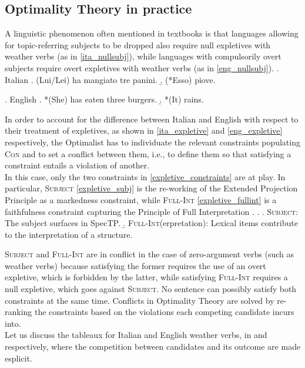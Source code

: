 \subsection{Optimality Theory in practice} A linguistic phenomenon often mentioned in textbooks is that languages allowing for topic-referring subjects to be dropped also require null expletives with weather verbs (as in \ref{ita_nullsubj}), while languages with compulsorily overt subjects require overt expletives with weather verbs (as in \ref{eng_nullsubj}).
\ex. \label{ita_nullsubj} Italian
\a. (Lui/Lei) ha mangiato tre panini.
\b. \label{ita_expletive} (*Esso) piove.

\ex. \label{eng_nullsubj} English
\a. *(She) has eaten three burgers.
\b. \label{eng_expletive} *(It) rains.

In order to account for the difference between Italian and English with respect to their treatment of expletives, as shown in \ref{ita_expletive} and \ref{eng_expletive} respectively, the Optimalist has to individuate the relevant constraints populating \textsc{Con} and to set a conflict between them, i.e., to define them so that satisfying a constraint entails a violation of another.\\
In this case, only the two constraints in \ref{expletive_constraints} are at play. In particular, \textsc{Subject} \ref{expletive_subj} is the re-working of the Extended Projection Principle \parencite{chomsky1982epp} as a markedness constraint, while \textsc{Full-Int} \ref{expletive_fullint} is a faithfulness constraint capturing the Principle of Full Interpretation \parencite{chomsky1991fullint}.
\ex. \label{expletive_constraints} \a. \label{expletive_subj} \textsc{Subject}: The subject surfaces in SpecTP.
\b. \label{expletive_fullint} \textsc{Full-Int}(erpretation): Lexical items contribute to the interpretation of a structure.

\textsc{Subject} and \textsc{Full-Int} are in conflict in the case of zero-argument verbs (such as weather verbs) because satisfying the former requires the use of an overt expletive, which is forbidden by the latter, while satisfying \textsc{Full-Int} requires a null expletive, which goes against \textsc{Subject}. No sentence can possibly satisfy both constraints at the same time. Conflicts in Optimality Theory are solved by re-ranking the constraints based on the violations each competing candidate incurs into.\\
Let us discuss the tableaux for Italian and English weather verbs, in  and  respectively, where the competition between candidates and its outcome are made esplicit.


